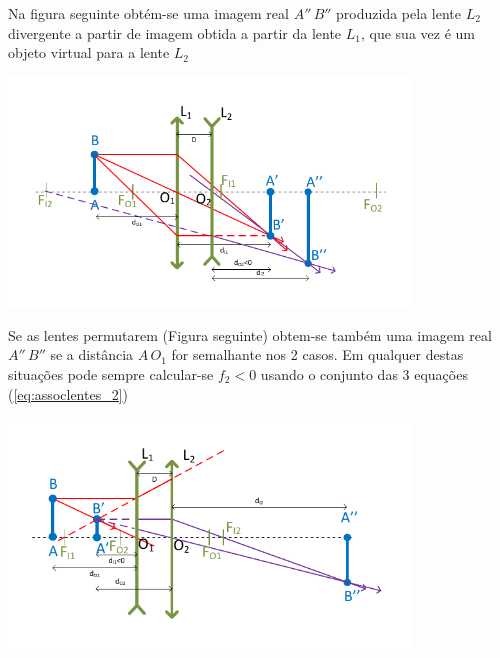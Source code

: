 \documentclass[a4paper,12pt]{article}      %
\begin{document}
Na figura seguinte obtém-se uma imagem real $A''\,B''$ produzida pela lente $L_2$ divergente a partir de imagem  obtida a partir da lente $L_1$, que sua vez é um objeto virtual para a lente $L_2$

\begin{center}
	\includegraphics[width=0.8\textwidth]{ConverDiverg_II}
\end{center}



Se as lentes permutarem (Figura seguinte) obtem-se também uma imagem real  $A''\,B''$ se a distância $A\,O_1$ for semalhante nos 2 casos.
Em qualquer destas situações pode sempre calcular-se $f_2 < 0$ usando o conjunto das 3 equações (\ref{eq:assoclentes_2})

\begin{center}
	\includegraphics[width=0.8\textwidth]{ConverDiverg_III}
\end{center}
\end{document}
